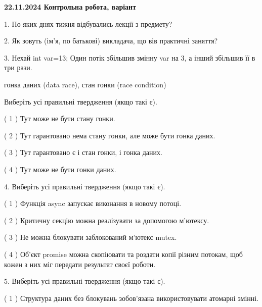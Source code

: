 \documentclass[12pt, ukrainian]{article}
\begin{document}
\vspace{4mm}
\newpage
\begin {large}

\textbf{22.11.2024 Контрольна робота, варіант  }\par


{
1. По яких днях тижня відбувались лекції з предмету?



\vspace{5mm}
2. Як зовуть (ім'я, по батькові) викладача, що вів практичні заняття?



\vspace{5mm}
3. Нехай int var=13; Один потік збільшив змінну var на 3, а інший збільшив її в три рази.

гонка даних (data race), стан гонки (race condition)

Виберіть усі правильні твердження (якщо такі є).\par
\vspace{2mm}
( 1 ) Тут може не бути стану гонки.%

( 2 ) Тут гарантовано нема стану гонки, але може бути гонка даних.%

( 3 ) Тут гарантовано є і стан гонки, і гонка даних.%

( 4 ) Тут може не бути гонки даних.%


\vspace{5mm}
4. Виберіть усі правильні твердження (якщо такі є).\par
\vspace{2mm}

( 1 ) Функція async запускає виконання в новому потоці.%

( 2 ) Критичну секцію можна реалізувати за допомогою м’ютексу.%

( 3 ) Не можна блокувати заблокований м’ютекс mutex.%

( 4 ) Об’єкт promise можна скопіювати та роздати копії різним потокам, щоб кожен з них міг передати результат своєї роботи.%


\vspace{5mm}
5. Виберіть усі правильні твердження (якщо такі є).\par
\vspace{2mm}

( 1 ) Структура даних без блокувань зобов’язана використовувати атомарні змінні.%

}
\end{large}
\end{document}
